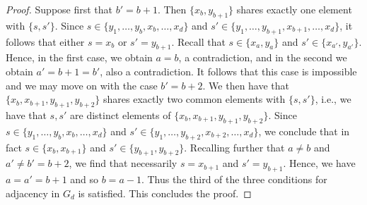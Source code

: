 \documentclass[centering,11pt,reqno]{amsart}
\newtheorem{lem}[theorem]{Lemma}
\theoremstyle{definition}
\begin{document}
\begin{proof}
Suppose first that $b'=b+1$. Then $\{x_b,y_{b+1}\}$ shares exactly one element with $\{s,s'\}$. Since $s\in \{y_1,\ldots,y_b,x_b,\ldots,x_d\}$ and $s'\in \{y_1,\ldots,y_{b+1},x_{b+1},\ldots,x_d\}$, it follows that either $s=x_b$ or $s'=y_{b+1}$. Recall that $s\in \{x_a,y_a\}$ and $s'\in \{x_{a'},y_{a'}\}$. Hence, in the first case, we obtain $a=b$, a contradiction, and in the second we obtain $a'=b+1=b'$, also a contradiction. It follows that this case is impossible and we may move on with the case $b'=b+2$. We then have that $\{x_b,x_{b+1},y_{b+1},y_{b+2}\}$ shares exactly two common elements with $\{s,s'\}$, i.e., we have that $s,s'$ are distinct elements of $\{x_b,x_{b+1},y_{b+1},y_{b+2}\}$. Since $s\in \{y_1,\ldots,y_b,x_b,\ldots,x_d\}$ and $s'\in \{y_1,\ldots,y_{b+2},x_{b+2},\ldots,x_d\}$, we conclude that in fact $s\in \{x_b,x_{b+1}\}$ and $s'\in \{y_{b+1},y_{b+2}\}$. Recalling further that $a\neq b$ and $a'\neq b'=b+2$, we find that necessarily $s=x_{b+1}$ and $s'=y_{b+1}$. Hence, we have $a=a'=b+1$ and so $b=a-1$. Thus the third of the three conditions for adjacency in $G_d$ is satisfied. This concludes the proof. 
\end{proof}




\end{document}
